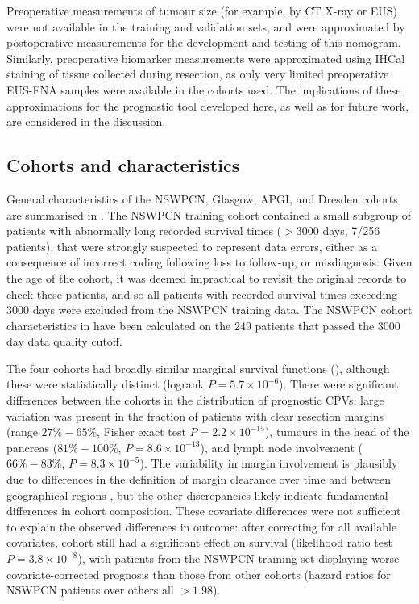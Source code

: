 \documentclass[dissertation.tex]{subfiles}
\begin{document}
Preoperative measurements of tumour size (for example, by \gls{CT} X-ray or \gls{EUS}) were not available in the training and validation sets, and were approximated by postoperative measurements for the development and testing of this nomogram.  Similarly, preoperative biomarker measurements were approximated using \gls{IHCal} staining of tissue collected during resection, as only very limited preoperative \gls{EUS}-\gls{FNA} samples were available in the cohorts used.  The implications of these approximations for the prognostic tool developed here, as well as for future work, are considered in the discussion.  

\subsection{Cohorts and characteristics}
General characteristics of the \gls{NSWPCN}, Glasgow, \gls{APGI}, and Dresden cohorts are summarised in .  The \gls{NSWPCN} training cohort contained a small subgroup of patients with abnormally long recorded survival times ($> 3000$ days, 7/256 patients), that were strongly suspected to represent data errors, either as a consequence of incorrect coding following loss to follow-up, or misdiagnosis.  Given the age of the cohort, it was deemed impractical to revisit the original records to check these patients, and so all patients with recorded survival times exceeding 3000 days were excluded from the \gls{NSWPCN} training data.  The \gls{NSWPCN} cohort characteristics in  have been calculated on the 249 patients that passed the 3000 day data quality cutoff.

The four cohorts had broadly similar marginal survival functions (), although these were statistically distinct (logrank $P = 5.7 \times 10^{-6}$).  There were significant differences between the cohorts in the distribution of prognostic \glspl{CPV}: large variation was present in the fraction of patients with clear resection margins (range $27\%-65\%$, Fisher exact test $P = 2.2 \times 10^{-15}$), tumours in the head of the pancreas ($81\%-100\%$, $P = 8.6 \times 10^{-13}$), and lymph node involvement ($66\%-83\%$, $P = 8.3 \times 10^{-5}$).  The variability in margin involvement is plausibly due to differences in the definition of margin clearance over time and between geographical regions \cite{Chang2015}, but the other discrepancies likely indicate fundamental differences in cohort composition.  These covariate differences were not sufficient to explain the observed differences in outcome: after correcting for all available covariates, cohort still had a significant effect on survival (likelihood ratio test $P = 3.8 \times 10^{-8}$), with patients from the \gls{NSWPCN} training set displaying worse covariate-corrected prognosis than those from other cohorts (hazard ratios for \gls{NSWPCN} patients over others all $> 1.98$).
\end{document}
